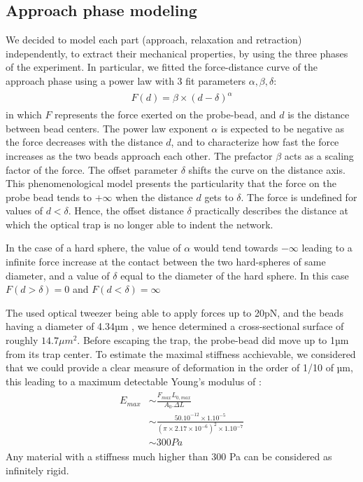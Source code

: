 \documentclass[A4paperpaper,11pt,english]{sphinxmanual}
\begin{document}
\subsection{Approach phase modeling}
\label{index-latex:approach-phase-modeling}
We
decided to model each part (approach, relaxation and retraction) independently, to extract their mechanical properties, by using the three phases of the experiment.
In particular, we fitted the force-distance curve of the approach phase using a power
law with 3 fit parameters \(\alpha, \beta, \delta\):
\label{index-latex:equation-eqa31}\begin{gather}
\begin{split}F(d) = \beta \times \left(d-\delta\right)^\alpha\end{split}\label{index-latex-eqa31}
\end{gather}
in which \(F\) represents the force exerted on the probe-bead, and \(d\)
is the distance between bead centers. The power law exponent \(\alpha\) is
expected to be negative as the force decreases with the distance \(d\), and
to characterize how fast the force increases as the two
beads approach each other. The prefactor \(\beta\) acts as a scaling factor of the
force. The offset parameter \(\delta\) shifts the curve on the distance
axis. This phenomenological model presents the particularity that the force on the probe bead tends to
\(+\infty\) when the distance \(d\) gets  to \(\delta\). The force
is undefined for values of \(d< \delta\). Hence, the offset distance \(\delta\)
practically describes the distance at which the optical trap is no longer able to
indent the network.

In the case of a hard sphere, the value of \(\alpha\) would tend towards
\(-\infty\) leading to a infinite force increase at the contact between the
two hard-spheres of same diameter, and a value of \(\delta\) equal to the
diameter of the hard sphere.  In this case \(F(d>\delta)=0\) and
\(F(d<\delta)=\infty\)

The used optical tweezer being able to apply forces up to 20pN, and the beads
having a diameter of 4.34µm , we hence determined a cross-sectional surface of roughly \(14.7\mu{}m^2\). Before
escaping the trap, the probe-bead did move up to 1µm from its
trap center. To estimate the maximal stiffness acchievable, we considered that we could
provide a clear measure of deformation in the order of 1/10 of µm,  this
leading to a maximum detectable Young's modulus of :
\label{index-latex:equation-eqa32a}\begin{gather}
\begin{split}E_{max} &\sim \frac{F_{max}L_{0,max}}{A_0.\Delta L} \\
        &\sim \frac{50.10^{-12} \times 1.10^{-5} }{  (\pi\times 2.17\times 10^{-6})^2 \times 1.10^{-7}              }\\
        & \sim 300 Pa\end{split}\label{index-latex-eqa32a}
\end{gather}
Any material with a stiffness much higher than 300 Pa can be considered as
infinitely rigid.
\end{document}
